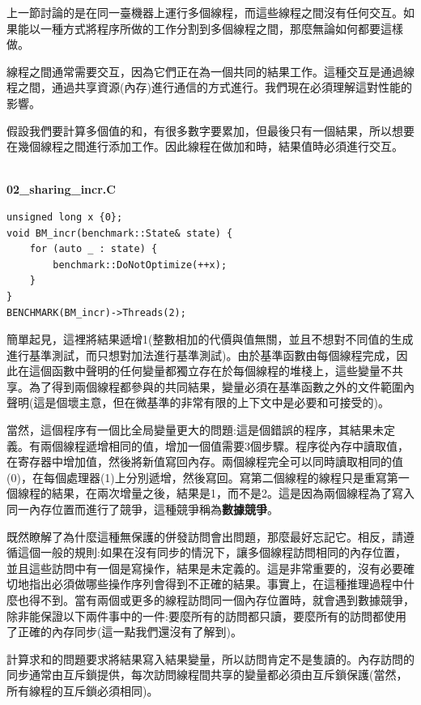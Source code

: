 上一節討論的是在同一臺機器上運行多個線程，而這些線程之間沒有任何交互。如果能以一種方式將程序所做的工作分割到多個線程之間，那麼無論如何都要這樣做。

線程之間通常需要交互，因為它們正在為一個共同的結果工作。這種交互是通過線程之間，通過共享資源(內存)進行通信的方式進行。我們現在必須理解這對性能的影響。

假設我們要計算多個值的和，有很多數字要累加，但最後只有一個結果，所以想要在幾個線程之間進行添加工作。因此線程在做加和時，結果值時必須進行交互。

\hspace*{\fill} \\ %
\noindent
\textbf{02\_sharing\_incr.C}
\begin{lstlisting}[style=styleCXX]
unsigned long x {0};
void BM_incr(benchmark::State& state) {
	for (auto _ : state) {
		benchmark::DoNotOptimize(++x);
	}
}
BENCHMARK(BM_incr)->Threads(2);
\end{lstlisting}

簡單起見，這裡將結果遞增1(整數相加的代價與值無關，並且不想對不同值的生成進行基準測試，而只想對加法進行基準測試)。由於基準函數由每個線程完成，因此在這個函數中聲明的任何變量都獨立存在於每個線程的堆棧上，這些變量不共享。為了得到兩個線程都參與的共同結果，變量必須在基準函數之外的文件範圍內聲明(這是個壞主意，但在微基準的非常有限的上下文中是必要和可接受的)。

當然，這個程序有一個比全局變量更大的問題:這是個錯誤的程序，其結果未定義。有兩個線程遞增相同的值，增加一個值需要3個步驟。程序從內存中讀取值，在寄存器中增加值，然後將新值寫回內存。兩個線程完全可以同時讀取相同的值(0)，在每個處理器(1)上分別遞增，然後寫回。寫第二個線程的線程只是重寫第一個線程的結果，在兩次增量之後，結果是1，而不是2。這是因為兩個線程為了寫入同一內存位置而進行了競爭，這種競爭稱為\textbf{數據競爭}。

既然瞭解了為什麼這種無保護的併發訪問會出問題，那麼最好忘記它。相反，請遵循這個一般的規則:如果在沒有同步的情況下，讓多個線程訪問相同的內存位置，並且這些訪問中有一個是寫操作，結果是未定義的。這是非常重要的，沒有必要確切地指出必須做哪些操作序列會得到不正確的結果。事實上，在這種推理過程中什麼也得不到。當有兩個或更多的線程訪問同一個內存位置時，就會遇到數據競爭，除非能保證以下兩件事中的一件:要麼所有的訪問都只讀，要麼所有的訪問都使用了正確的內存同步(這一點我們還沒有了解到)。

計算求和的問題要求將結果寫入結果變量，所以訪問肯定不是隻讀的。內存訪問的同步通常由互斥鎖提供，每次訪問線程間共享的變量都必須由互斥鎖保護(當然，所有線程的互斥鎖必須相同)。

